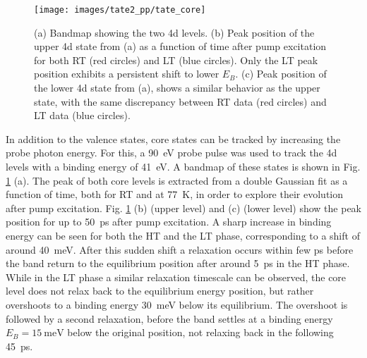 \begin{figure}[t!]
	\centering
	\texttt{[image: images/tate2\_pp/tate\_core]}
	\caption{(a) Bandmap showing the two  4d levels. (b) Peak position of the upper 4d state from (a) as a function of time after pump excitation for both RT (red circles) and LT (blue circles). Only the LT peak position exhibits a persistent shift to lower $E_B$. (c) Peak position of the lower 4d state from (a), shows a similar behavior as the upper state, with the same discrepancy between RT data (red circles) and LT data (blue circles).}
	\label{fig:tate_core}
\end{figure}


In addition to the valence states, core states can be tracked by increasing the probe photon energy.
For this, a \qty{90}{\electronvolt} probe pulse was used to track the  4d levels with a binding energy of \qty{41}{\electronvolt}.
A bandmap of these states is shown in Fig. \ref{fig:tate_core} (a).
The peak of both core levels is extracted from a double Gaussian fit as a function of time, both for RT and at \qty{77}{\kelvin}, in order to explore their evolution after pump excitation.
Fig. \ref{fig:tate_core} (b) (upper level) and (c) (lower level) show the peak position for up to \qty{50}{\pico\second} after pump excitation.
A sharp increase in binding energy can be seen for both the HT and the LT phase, corresponding to a shift of around \qty{40}{\milli\electronvolt}.
After this sudden shift a relaxation occurs within few \unit{\pico\second} before the band return to the equilibrium position after around \qty{5}{\pico\second} in the HT phase.
While in the LT phase a similar relaxation timescale can be observed, the core level does not relax back to the equilibrium energy position, but rather overshoots to a binding energy \qty{30}{\milli\electronvolt} below its equilibrium.
The overshoot is followed by a second relaxation, before the band settles at a binding energy $E_B=\qty{15}{\milli\electronvolt}$ below the original position, not relaxing back in the following \qty{45}{\pico\second}.


